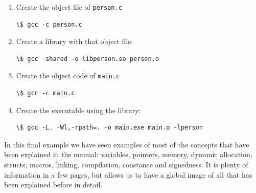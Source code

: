 \documentclass[a4paper]{article}
\begin{document}
\noindent
\begin{minipage}[H]{\linewidth}
\begin{enumerate}
\item Create the object file of \verb!person.c!

\noindent
\begin{minipage}[H]{\linewidth}
\mbox{}
\begin{lstlisting}[style=terminalStyle]
\$ gcc -c person.c
\end{lstlisting}
\end{minipage}
\item Create a library with that object file:

\noindent
\begin{minipage}[H]{\linewidth}
\mbox{}
\begin{lstlisting}[style=terminalStyle]
\$ gcc -shared -o libperson.so person.o
\end{lstlisting}
\end{minipage}
\item Create the object code of \verb!main.c!

\noindent
\begin{minipage}[H]{\linewidth}
\mbox{}
\begin{lstlisting}[style=terminalStyle]
\$ gcc -c main.c
\end{lstlisting}
\end{minipage}
\item Create the executable using the library:

\noindent
\begin{minipage}[H]{\linewidth}
\mbox{}
\begin{lstlisting}[style=terminalStyle]
\$ gcc -L. -Wl,-rpath=. -o main.exe main.o -lperson
\end{lstlisting}
\end{minipage}
\end{enumerate}
\end{minipage}

In this final example we have seen examples of most of the concepts that have
been explained in the manual: variables, pointers, memory, dynamic allocation,
structs, macros, linking, compilation, constance and signedness. It is plenty of
information in a few pages, but allows us to have a global image of all that
has been explained before in detail.
\end{document}
